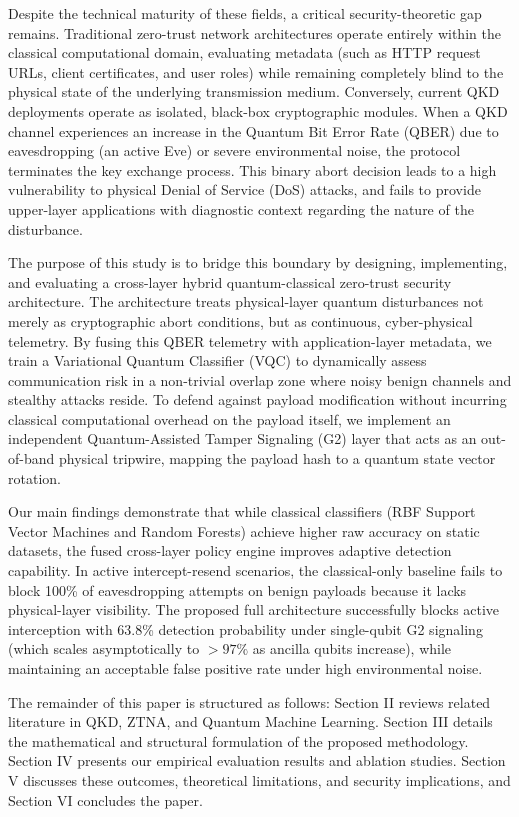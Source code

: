 \documentclass[conference]{IEEEtran}
\begin{document}
Despite the technical maturity of these fields, a critical security-theoretic gap remains. Traditional zero-trust network architectures operate entirely within the classical computational domain, evaluating metadata (such as HTTP request URLs, client certificates, and user roles) while remaining completely blind to the physical state of the underlying transmission medium. Conversely, current QKD deployments operate as isolated, black-box cryptographic modules. When a QKD channel experiences an increase in the Quantum Bit Error Rate (QBER) due to eavesdropping (an active Eve) or severe environmental noise, the protocol terminates the key exchange process. This binary abort decision leads to a high vulnerability to physical Denial of Service (DoS) attacks, and fails to provide upper-layer applications with diagnostic context regarding the nature of the disturbance.

The purpose of this study is to bridge this boundary by designing, implementing, and evaluating a cross-layer hybrid quantum-classical zero-trust security architecture. The architecture treats physical-layer quantum disturbances not merely as cryptographic abort conditions, but as continuous, cyber-physical telemetry. By fusing this QBER telemetry with application-layer metadata, we train a Variational Quantum Classifier (VQC) to dynamically assess communication risk in a non-trivial overlap zone where noisy benign channels and stealthy attacks reside. To defend against payload modification without incurring classical computational overhead on the payload itself, we implement an independent Quantum-Assisted Tamper Signaling (G2) layer that acts as an out-of-band physical tripwire, mapping the payload hash to a quantum state vector rotation.

Our main findings demonstrate that while classical classifiers (RBF Support Vector Machines and Random Forests) achieve higher raw accuracy on static datasets, the fused cross-layer policy engine improves adaptive detection capability. In active intercept-resend scenarios, the classical-only baseline fails to block 100\% of eavesdropping attempts on benign payloads because it lacks physical-layer visibility. The proposed full architecture successfully blocks active interception with 63.8\% detection probability under single-qubit G2 signaling (which scales asymptotically to $>97\%$ as ancilla qubits increase), while maintaining an acceptable false positive rate under high environmental noise.

The remainder of this paper is structured as follows: Section II reviews related literature in QKD, ZTNA, and Quantum Machine Learning. Section III details the mathematical and structural formulation of the proposed methodology. Section IV presents our empirical evaluation results and ablation studies. Section V discusses these outcomes, theoretical limitations, and security implications, and Section VI concludes the paper.
\end{document}
